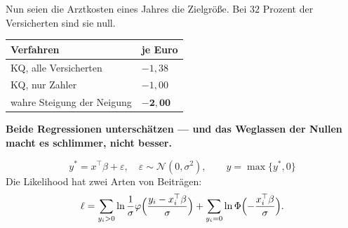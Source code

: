 \begin{merksatz}
Nun seien die Arztkosten eines Jahres die Zielgröße. Bei $32$ Prozent der Versicherten sind sie null.

\begin{center}
{\small
\renewcommand{\arraystretch}{1.48}
\begin{tabular}{@{}P{3.4cm}P{2.4cm}@{}}
\toprule
\textbf{Verfahren} & \textbf{je Euro}\\
\midrule
KQ, alle Versicherten & $-1{,}38$\\
KQ, nur Zahler & $-1{,}00$\\
\midrule
wahre Steigung der Neigung & $\mathbf{-2{,}00}$\\
\bottomrule
\end{tabular}}
\end{center}

\begin{center}
\begin{minipage}{0.9\textwidth}
\textbf{Beide Regressionen unterschätzen --- und das Weglassen der Nullen macht es schlimmer, nicht besser.}
\end{minipage}
\end{center}
\end{merksatz}

\begin{definition}
\[ y^{*} = x^{\top}\beta + \varepsilon, \quad \varepsilon\sim\mathcal N(0,\sigma^{2}), \qquad y = \max\{y^{*},0\} \]
Die Likelihood hat zwei Arten von Beiträgen:
\[ \ell = \sum_{y_i>0}\ln\frac1\sigma\varphi\Bigl(\frac{y_i-x_i^{\top}\beta}{\sigma}\Bigr) + \sum_{y_i=0}\ln\Phi\Bigl(-\frac{x_i^{\top}\beta}{\sigma}\Bigr) . \]
\end{definition}

